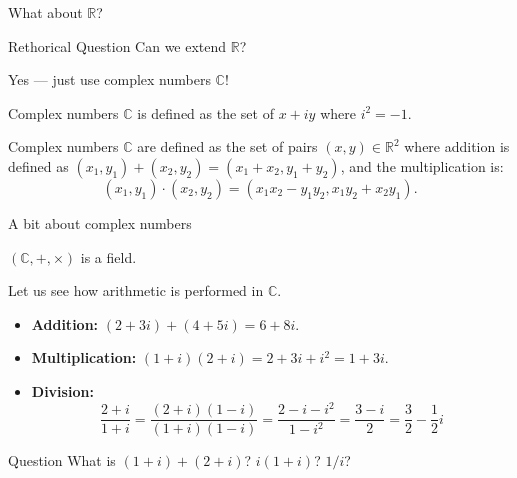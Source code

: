 \documentclass{zkdl-presentation-template}
\begin{document}
    \begin{frame}{What about $\mathbb{R}$?}
        \begin{alertblock}{Rethorical Question}
           Can we extend $\mathbb{R}$?
        \end{alertblock}

        Yes --- just use complex numbers $\mathbb{C}$!

        \begin{definition}
            Complex numbers $\mathbb{C}$ is defined as the set of $x+iy$ where $i^2=-1$.
        \end{definition}

        \begin{definition}
            Complex numbers $\mathbb{C}$ are defined as the set of pairs $(x,y) \in \mathbb{R}^2$ where addition is defined as $(x_1,y_1)+(x_2,y_2)=(x_1+x_2,y_1+y_2)$, and the multiplication is:
            \begin{equation*}
                (x_1,y_1) \cdot (x_2,y_2) = (x_1x_2-y_1y_2,x_1y_2+x_2y_1).
            \end{equation*}
        \end{definition}
    \end{frame}

    \begin{frame}{A bit about complex numbers}
        \begin{theorem}
            $(\mathbb{C},+,\times)$ is a field.
        \end{theorem}

        \begin{example}
            Let us see how arithmetic is performed in $\mathbb{C}$.
            \begin{itemize}
                \item \textbf{Addition:} $(2+3i)+(4+5i)=6+8i$.
                \item \textbf{Multiplication:} $(1+i)(2+i)=2+3i+i^2=1+3i$.
                \item \textbf{Division:}
                \begin{equation*}
                    \frac{2+i}{1+i} = \frac{(2+i)(1-i)}{(1+i)(1-i)} = \frac{2-i-i^2}{1-i^2} = \frac{3-i}{2} = \frac{3}{2} - \frac{1}{2}i
                \end{equation*}
            \end{itemize}
        \end{example}
        
        \begin{alertblock}{Question}
            What is $(1+i)+(2+i)$? $i(1+i)$? $1/i$?
        \end{alertblock}
    \end{frame}
\end{document}
